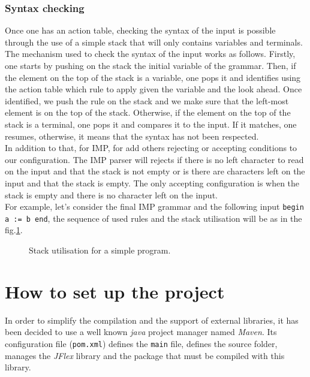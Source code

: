 \documentclass[a4paper,11pt]{article}
\begin{document}
    \subsubsection{Syntax checking}
      Once one has an action table, checking the syntax of the input is possible through the use of a simple stack that will only contains variables and terminals. The mechanism used to check the syntax of the input works as follows. Firstly, one starts by pushing on the stack the initial variable of the grammar. Then, if the element on the top of the stack is a variable, one pops it and identifies using the action table which rule to apply given the variable and the look ahead. Once identified, we push the rule on the stack and we make sure that the left-most element is on the top of the stack. Otherwise, if the element on the top of the stack is a terminal, one pops it and compares it to the input. If it matches, one resumes, otherwise, it means that the syntax has not been respected.\\
      In addition to that, for IMP, for add others rejecting or accepting conditions to our configuration. The IMP parser will rejects if there is no left character to read on the input and that the stack is not empty or is there are characters left on the input and that the stack is empty. The only accepting configuration is when the stack is empty and there is no character left on the input.\\
      For example, let's consider the final IMP grammar and the following input \verb|begin a := b end|, the sequence of used rules and the stack utilisation will be as in the fig.\ref{fig:simpleprogram}.
      \begin{figure}[h!]
        
        \caption{Stack utilisation for a simple program.}
        \label{fig:simpleprogram}
      \end{figure}    

\section{How to set up the project}
  In order to simplify the compilation and the support of external libraries, it has been decided to use a well known \textit{java} project manager named \textit{Maven}. Its configuration file (\verb|pom.xml|) defines the \verb|main| file, defines the source folder, manages the \textit{JFlex} library and the package that must be compiled with this library.
\end{document}

